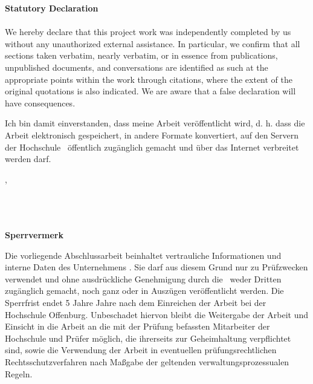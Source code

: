 \clearpage
\textsf{\large\textbf{Statutory Declaration}}
\\
\\
We hereby declare that this project work was independently completed by us without any unauthorized external assistance. In particular, we confirm that all sections taken verbatim, nearly verbatim, or in essence from publications, unpublished documents, and conversations are identified as such at the appropriate points within the work through citations, where the extent of the original quotations is also indicated. We are aware that a false declaration will have consequences.

%
{
\vspace{0.5cm}
Ich bin damit einverstanden, dass meine Arbeit veröffentlicht wird, d. h. dass die Arbeit elektronisch gespeichert, in andere Formate konvertiert, auf den Servern der Hochschule \hsmaort\ öffentlich zugänglich gemacht und über das Internet verbreitet werden darf.
}{}%

\vspace{1cm}
\hsmaort, \hsmadatum\\

\vspace{1.2cm}						                                      
\hsmaautor
\\
\\
\\

%
{%
\vspace{5cm}
\color{red}\textsf{\large\textbf{Sperrvermerk}}

Die vorliegende Abschlussarbeit beinhaltet vertrauliche Informationen und interne Daten des Unternehmens \hsmafirma.
Sie darf aus diesem Grund nur zu Prüfzwecken verwendet und ohne ausdrückliche Genehmigung durch die \hsmafirma\ weder Dritten zugänglich gemacht, noch ganz oder in Auszügen veröffentlicht werden. Die Sperrfrist endet 5 Jahre Jahre nach dem Einreichen der Arbeit bei der Hochschule Offenburg. Unbeschadet hiervon bleibt die Weitergabe der Arbeit und Einsicht in die Arbeit an die mit der Prüfung befassten Mitarbeiter der Hochschule und Prüfer möglich, die ihrerseits zur Geheimhaltung verpflichtet sind, sowie die Verwendung der Arbeit in eventuellen prüfungsrechtlichen Rechtsschutzverfahren nach Maßgabe der geltenden verwaltungsprozessualen Regeln.
\color{black}
}{}

\cleardoublepage



